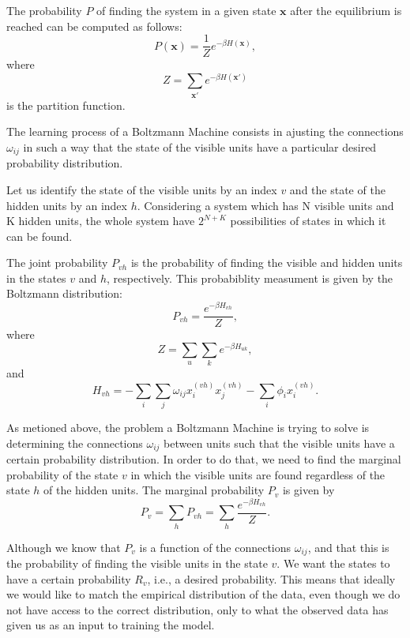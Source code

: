 The probability $P$ of finding the system in a given state $\mathbf{x}$ after the equilibrium is reached can be computed as follows:
\begin{equation}
  P(\mathbf{x}) = \frac{1}{Z} e^{-\beta H(\mathbf{x})},
  \label{eq:eq6}
\end{equation}
where
\begin{equation}
  Z = \sum_{\mathbf{x}'} e^{-\beta H(\mathbf{x}')}
  \label{eq:eq7}
\end{equation}
is the partition function.

The learning process of a Boltzmann Machine consists in ajusting the connections $\omega_{ij}$ in such a way that the state of the visible units have a particular desired probability distribution.

Let us identify the state of the visible units by an index $v$ and the state of the hidden units by an index $h$.
Considering a system which has N visible units and K hidden units, the whole system have $2^{N + K}$ possibilities of states in which it can be found.

The joint probability $P_{vh}$ is the probability of finding the visible and hidden units in the states $v$ and $h$, respectively.
This probabiblity measument is given by the Boltzmann distribution:
\begin{equation}
  P_{vh} = \frac{e^{-\beta H_{vh}}}{Z},
  \label{eq:eq8}
\end{equation}
where
\begin{equation}
  Z = \sum_{u} \sum_{k} e^{-\beta H_{uk}},
  \label{eq:eq9}
\end{equation}
and
\begin{equation}
  H_{vh} = - \sum_{i} \sum_{j} \omega_{ij} x^{(vh)}_{i} x^{(vh)}_{j} - \sum_{i} \phi_{i} x^{(vh)}_{i}.
  \label{eq:eq10}
\end{equation}

As metioned above, the problem a Boltzmann Machine is trying to solve is determining the connections $\omega_{ij}$ between units such that the visible units have a certain probability distribution.
In order to do that, we need to find the marginal probability of the state $v$ in which the visible units are found regardless of the state $h$ of the hidden units. The marginal probability $P_{v}$ is given by
\begin{equation}
  P_{v} = \sum_{h} P_{vh} = \sum_{h} \frac{e^{-\beta H_{vh}}}{Z}.
  \label{eq:marginal_prob}
\end{equation}

Although we know that $P_{v}$ is a function of the connections $\omega_{ij}$, and that this is the probability of finding the visible units in the state $v$. We want the states to have a certain probability $R_{v}$, i.e., a desired probability.
This means that ideally we would like to match the empirical distribution of the data, even though we do not have access to the correct distribution, only to what the observed data has given us as an input to training the model.

